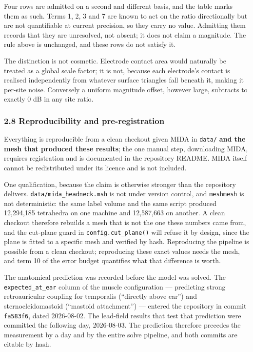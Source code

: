 \documentclass[
  11pt,
  letterpaper,
]{article}
\begin{document}
Four rows are admitted on a second and different basis, and the table marks them
as such. Terms 1, 2, 3 and 7 are known to act on the ratio directionally but are
not quantifiable at current precision, so they carry no value. Admitting them
records that they are unresolved, not absent; it does not claim a
magnitude. The rule above is unchanged, and these rows do not satisfy it.

The distinction is not cosmetic. Electrode contact area would naturally be
treated as a global scale factor; it is not, because each electrode's contact is
realised independently from whatever surface triangles fall beneath it, making
it per-site noise. Conversely a uniform magnitude offset, however large,
subtracts to exactly 0 dB in any site ratio.

\subsubsection{2.8 Reproducibility and pre-registration}\label{reproducibility-and-pre-registration}

Everything is reproducible from a clean checkout given MIDA in \texttt{data/} \textbf{and the mesh that produced these results}; the one
manual step, downloading MIDA, requires registration and is documented in the
repository README. MIDA itself cannot be redistributed under its licence and is
not included.

One qualification, because the claim is otherwise stronger than the repository
delivers. \texttt{data/mida\_headneck.msh} is not under version control, and \texttt{meshmesh}
is not deterministic: the same label volume and the same script produced
12,294,185 tetrahedra on one machine and 12,587,663 on another. A clean checkout
therefore rebuilds a mesh that is not the one these numbers came from, and the
cut-plane guard in \texttt{config.cut\_plane()} will refuse it by design, since the
plane is fitted to a specific mesh and verified by hash. Reproducing the
pipeline is possible from a clean checkout; reproducing these exact values needs
the mesh, and term 10 of the error budget quantifies what that difference is
worth.

The anatomical prediction was recorded before the model was solved. The
\texttt{expected\_at\_ear} column of the muscle configuration --- predicting strong
retroauricular coupling for temporalis (``directly above ear'') and
sternocleidomastoid (``mastoid attachment'') --- entered the repository in commit
\texttt{fa583f6}, dated 2026-08-02. The lead-field results that test that prediction
were committed the following day, 2026-08-03. The prediction therefore precedes
the measurement by a day and by the entire solve pipeline, and both commits are
citable by hash.
\end{document}
